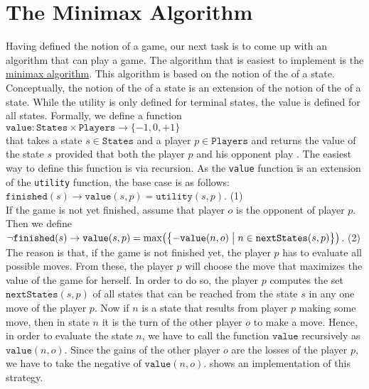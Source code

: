 \section{The Minimax Algorithm \label{sec:minimax}}
Having defined the notion of a game, our next task is to come up with an algorithm that can play a game.  The
algorithm that is easiest to implement is the \href{https://en.wikipedia.org/wiki/Minimax}{minimax algorithm}.  This
algorithm is based on the notion of the  of a state. 
Conceptually, the notion of the  of a state is an extension of the notion of the 
 of a state.  While the utility is only defined for terminal
states, the value is defined for all states.  Formally, we define a function
\\[0.2cm]
\hspace*{1.3cm}
$\texttt{value}: \texttt{States} \times \texttt{Players} \rightarrow \{-1, 0, +1\}$
\\[0.2cm]
that takes a state $s \in \texttt{States}$ and a player $p \in \texttt{Players}$ and returns the value of the
state $s$ provided that both the player $p$ and his opponent play .  The easiest way to define
this function is via recursion.  As the 
\texttt{value} function is an extension of the \texttt{utility} function, the base case is as follows:
\\[0.2cm]
\hspace*{1.3cm}
$\texttt{finished}(s) \rightarrow \texttt{value}(s, p) = \texttt{utility}(s, p)$. \hspace*{\fill} (1)
\\[0.2cm]
If the game is not yet finished, assume that player $o$ is the opponent of player $p$.  Then we define
\\[0.2cm]
\hspace*{1.3cm}
$\neg \texttt{finished}(s) \rightarrow 
 \texttt{value}(s, p) = \max\bigl(\bigl\{
                     -\texttt{value}(n, o) \bigm| n \in \texttt{nextStates}(s, p)
                     \bigr\}\bigr)
$.  \hspace*{\fill} (2)
\\[0.2cm]
The reason is that, if the game is not finished yet, the player $p$ has to evaluate all possible moves.  
From these, the player $p$ will choose the move that maximizes the value of the game for herself.  In order to
do so, the player $p$ computes the set 
$\texttt{nextStates}(s, p)$ of all states that can be reached from the state $s$ in any one move of the player $p$.
Now if $n$ is a state that results from player $p$ making some move, then in state $n$ it is the turn of the other player
$o$ to make a move.  Hence, in order to evaluate the state $n$, we have to call the function $\texttt{value}$
recursively as $\texttt{value}(n,o)$.   Since the gains of the other player $o$ are the losses of the player
$p$, we have to take the negative of  $\texttt{value}(n, o)$.
 shows an implementation of this strategy.


